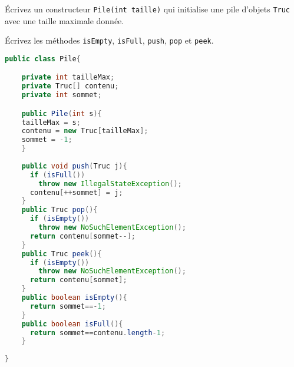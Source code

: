 \documentclass[iutinfo,a4paper,nocorrections,10pt]{ustl-tdtp}
\begin{document}
\question Écrivez un constructeur \texttt{Pile(int taille)} qui initialise une pile d’objets \texttt{Truc} avec une taille maximale donnée.

\question Écrivez les méthodes \texttt{isEmpty}, \texttt{isFull}, \texttt{push}, \texttt{pop} et \texttt{peek}.

\begin{correction}
{\color{red}
\begin{lstlisting}[language=Java]
public class Pile{

    private int tailleMax;
    private Truc[] contenu;
    private int sommet;

    public Pile(int s){
	tailleMax = s;
	contenu = new Truc[tailleMax];
	sommet = -1;
    }
    
    public void push(Truc j){
      if (isFull())
        throw new IllegalStateException(); 
	  contenu[++sommet] = j;
    }
    public Truc pop(){
      if (isEmpty())
        throw new NoSuchElementException(); 
	  return contenu[sommet--];
    }
    public Truc peek(){
      if (isEmpty())
        throw new NoSuchElementException(); 
	  return contenu[sommet];
    }
    public boolean isEmpty(){
	  return sommet==-1;
    }  
    public boolean isFull(){
	  return sommet==contenu.length-1;
    } 
    
}
\end{lstlisting}
}

\end{correction}

%
%
%
%
%
%
\end{document}
